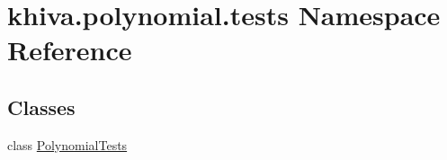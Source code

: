 \hypertarget{namespacekhiva_1_1polynomial_1_1tests}{}\section{khiva.\+polynomial.\+tests Namespace Reference}
\label{namespacekhiva_1_1polynomial_1_1tests}
\subsection*{Classes}
\begin{DoxyCompactItemize}
\item 
class \mbox{\hyperlink{classkhiva_1_1polynomial_1_1tests_1_1_polynomial_tests}{Polynomial\+Tests}}
\end{DoxyCompactItemize}
